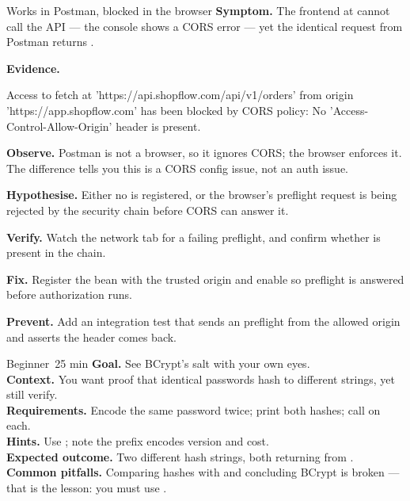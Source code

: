 \begin{debuglab}{Works in Postman, blocked in the browser}
\textbf{Symptom.} The frontend at  cannot call the API --- the console shows a CORS error --- yet the identical request from Postman returns .

\smallskip\textbf{Evidence.}
\begin{bashbox}
Access to fetch at 'https://api.shopflow.com/api/v1/orders'
from origin 'https://app.shopflow.com' has been blocked by CORS
policy: No 'Access-Control-Allow-Origin' header is present.
\end{bashbox}

\begin{tickcheck}
  \item \textbf{Observe.} Postman is not a browser, so it ignores CORS; the browser enforces it. The difference tells you this is a CORS config issue, not an auth issue.
  \item \textbf{Hypothesise.} Either no  is registered, or the browser's preflight  request is being rejected by the security chain before CORS can answer it.
  \item \textbf{Verify.} Watch the network tab for a failing  preflight, and confirm whether  is present in the chain.
  \item \textbf{Fix.} Register the  bean with the trusted origin and enable  so preflight is answered before authorization runs.
  \item \textbf{Prevent.} Add an integration test that sends an  preflight from the allowed origin and asserts the  header comes back.
\end{tickcheck}
\end{debuglab}


\begin{minilab}{Beginner}{~25 min}
\textbf{Goal.} See BCrypt's salt with your own eyes.\\
\textbf{Context.} You want proof that identical passwords hash to different strings, yet still verify.\\
\textbf{Requirements.} Encode the same password twice; print both hashes; call  on each.\\
\textbf{Hints.} Use ; note the  prefix encodes version and cost.\\
\textbf{Expected outcome.} Two different hash strings, both returning  from .\\
\textbf{Common pitfalls.} Comparing hashes with  and concluding BCrypt is broken --- that is the lesson: you must use .
\end{minilab}

